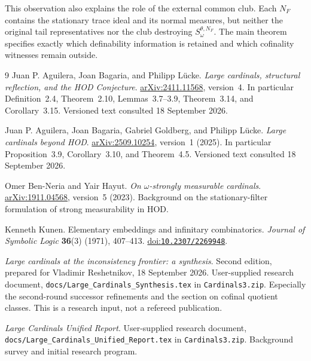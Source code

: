 \documentclass[11pt,letterpaper]{article}
\theoremstyle{definition}
\numberwithin{equation}{section}
\newcommand{\HOD}{\mathrm{HOD}}
\newcommand{\arxiv}[1]{\href{https://arxiv.org/abs/#1}{arXiv:#1}}
\newcommand{\doi}[1]{\href{https://doi.org/#1}{doi:\nolinkurl{#1}}}
\begin{document}
This observation also explains the role of the external common club. Each $N_F$ contains the stationary trace ideal and its normal measures, but neither the original tail representatives nor the club destroying $S_\omega^{\theta,N_F}$. The main theorem specifies exactly which definability information is retained and which cofinality witnesses remain outside.

\begin{thebibliography}{9}
\small
{}
Juan P. Aguilera, Joan Bagaria, and Philipp L\"ucke.
\emph{Large cardinals, structural reflection, and the HOD Conjecture}.
\arxiv{2411.11568}, version~4. In particular Definition~2.4, Theorem~2.10, Lemmas~3.7--3.9, Theorem~3.14, and Corollary~3.15. Versioned text consulted 18 September 2026.

Juan P. Aguilera, Joan Bagaria, Gabriel Goldberg, and Philipp L\"ucke.
\emph{Large cardinals beyond HOD}.
\arxiv{2509.10254}, version~1 (2025). In particular Proposition~3.9, Corollary~3.10, and Theorem~4.5. Versioned text consulted 18 September 2026.

Omer Ben-Neria and Yair Hayut.
\emph{On $\omega$-strongly measurable cardinals}.
\arxiv{1911.04568}, version~5 (2023).
Background on the stationary-filter formulation of strong measurability in $\HOD$.

Kenneth Kunen.
Elementary embeddings and infinitary combinatorics.
\emph{Journal of Symbolic Logic} \textbf{36}(3) (1971), 407--413.
\doi{10.2307/2269948}.

\emph{Large cardinals at the inconsistency frontier: a synthesis}.
Second edition, prepared for Vladimir Reshetnikov, 18 September 2026.
User-supplied research document, \nolinkurl{docs/Large_Cardinals_Synthesis.tex} in \nolinkurl{Cardinals3.zip}. Especially the second-round successor refinements and the section on cofinal quotient classes. This is a research input, not a refereed publication.

\emph{Large Cardinals Unified Report}.
User-supplied research document, \nolinkurl{docs/Large_Cardinals_Unified_Report.tex} in \nolinkurl{Cardinals3.zip}. Background survey and initial research program.
\end{thebibliography}
\end{document}
